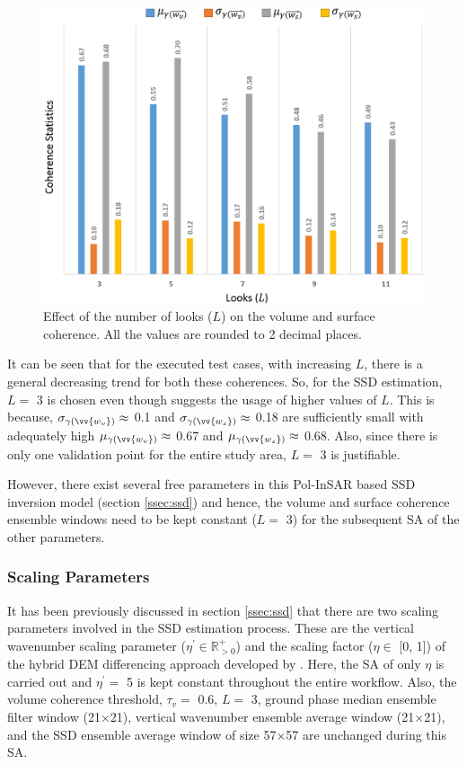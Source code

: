 \documentclass[review]{elsarticle}
\numberwithin{equation}{section}
\numberwithin{figure}{section}
\numberwithin{table}{section}
\begin{document}
\begin{figure}[htb]
    \centering
    \includegraphics[width=\textwidth]{Figures/Results/Coh_SSD.png}
    \caption{Effect of the number of looks ($L$) on the volume and surface coherence. All the values are rounded to 2
decimal places.}
    \label{fig:ssd_coh}
\end{figure}

It can be seen that for the executed test cases, with increasing $L$, there is a general decreasing trend for both these coherences. So, for the SSD estimation, $L =$ 3 is chosen even though \cite{Cloude2005} suggests the usage of higher values of $L$. This is because, $\sigma_{\gamma\left(\vv{w_v}\right)} \approx$ 0.1 and $\sigma_{\gamma\left(\vv{w_s}\right)} \approx$ 0.18 are sufficiently small with adequately high $\mu_{\gamma\left(\vv{w_v}\right)} \approx$ 0.67 and $\mu_{\gamma\left(\vv{w_s}\right)} \approx$ 0.68. Also, since there is only one validation point for the entire study area, $L =$ 3 is justifiable.

However, there exist several free parameters in this Pol-InSAR based SSD inversion model (section \ref{ssec:ssd}) and hence, the volume and surface coherence ensemble windows need to be kept constant ($L =$ 3) for the subsequent SA of the other parameters.

\subsubsection*{Scaling Parameters}

It has been previously discussed in section \ref{ssec:ssd} that there are two scaling parameters involved in the SSD estimation process. These are the vertical wavenumber scaling parameter ($\eta^\prime\in\mathbb{R}_{>0}^+$) and the scaling factor ($\eta\in$ [0, 1]) of the hybrid DEM differencing approach developed by \cite{Cloude2010}. Here, the SA of only $\eta$ is carried out and $\eta^\prime = $ 5 is kept constant throughout the entire workflow. Also, the volume coherence threshold, $\tau_v = $ 0.6, $L =$ 3, ground phase median ensemble filter window (21$\times$21), vertical wavenumber ensemble average window (21$\times$21), and the SSD ensemble average window of size 57$\times$57 are unchanged during this SA.
\end{document}
